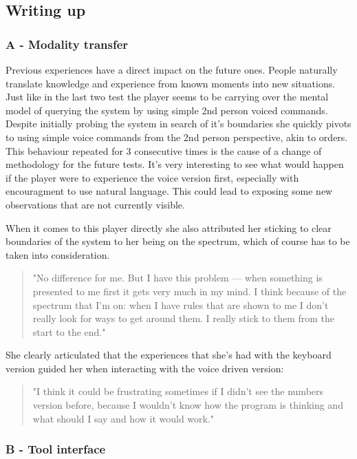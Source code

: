 \subsection{Writing up}

\subsubsection{A - Modality transfer}


Previous experiences have a direct impact on the future ones. People naturally translate knowledge and experience from known moments into new situations.
Just like in the last two test the player seems to be carrying over the mental model of querying the system by using simple 2nd person voiced commands. Despite initially probing the system in search of it's boundaries she quickly pivots to using simple voice commands from the 2nd person perspective, akin to orders. This behaviour repeated for 3 consecutive times is the cause of a change of methodology for the future tests. It's very interesting to see what would happen if the player were to experience the voice version first, especially with encouragment to use natural language. This could lead to exposing some new observations that are not currently visible. 

When it comes to this player directly she also attributed her sticking to clear boundaries of the system to her being on the spectrum, which of course has to be taken into consideration.

\begin{quote}
    "No difference for me. But I have this problem — when something is presented to me first it gets very much in my mind. I think because of the spectrum that I'm on: when I have rules that are shown to me I don't really look for ways to get around them. I really stick to them from the start to the end."
\end{quote}

She clearly articulated that the experiences that she's had with the keyboard version guided her when interacting with the voice driven version:

\begin{quote}
    "I think it could be frustrating sometimes if I didn't see the numbers version before, because I wouldn't know how the program is thinking and what should I say and how it would work."
\end{quote}

\subsubsection{B - Tool interface}



